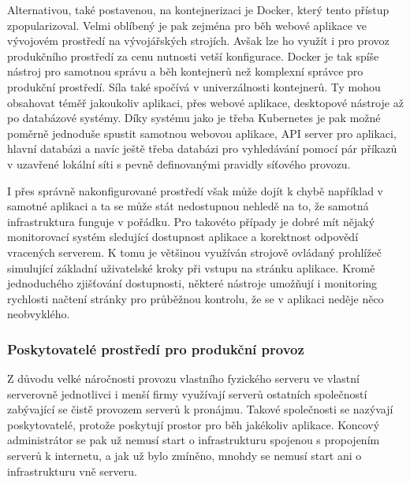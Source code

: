 \begin{itemize}
\begin{itemize}
		Alternativou, také postavenou, na kontejnerizaci je Docker, který tento přístup zpopularizoval.
		Velmi oblíbený je pak zejména pro běh webové aplikace ve vývojovém prostředí na vývojářských strojích.
		Avšak lze ho využít i pro provoz produkčního prostředí za cenu nutnosti vetší konfigurace.
		Docker je tak spíše nástroj pro samotnou správu a běh kontejnerů než komplexní správce pro produkční prostředí.
		Síla také spočívá v univerzálnosti kontejnerů.
		Ty mohou obsahovat téměř jakoukoliv aplikaci, přes webové aplikace, desktopové nástroje až po databázové systémy.
		Díky systému jako je třeba Kubernetes je pak možné poměrně jednoduše spustit samotnou webovou aplikace, API server pro
		aplikaci, hlavní databázi a navíc ještě třeba databázi pro vyhledávání pomocí pár příkazů v uzavřené lokální síti
		s pevně definovanými pravidly síťového provozu.


		I přes správně nakonfigurované prostředí však může dojít k chybě například v samotné aplikaci a ta se může stát nedostupnou
		nehledě na to, že samotná infrastruktura funguje v pořádku.
		Pro takovéto případy je dobré mít nějaký monitorovací systém sledující dostupnost aplikace a korektnost odpovědí
		vracených serverem.
		K tomu je většinou využíván strojově ovládaný prohlížeč simulující základní uživatelské kroky při vstupu na stránku
		aplikace.
		Kromě jednoduchého zjišťování dostupnosti, některé nástroje umožňují i monitoring rychlosti načtení stránky pro
		průběžnou kontrolu, že se v aplikaci neděje něco neobvyklého.

		\subsubsection{Poskytovatelé prostředí pro produkční provoz}

		Z důvodu velké náročnosti provozu vlastního fyzického serveru ve vlastní serverovně jednotlivci i menší firmy
		využívají serverů ostatních společností zabývající se čistě provozem serverů k pronájmu.
		Takové společnosti se nazývají poskytovatelé, protože poskytují prostor pro běh jakékoliv aplikace.
		Koncový administrátor se pak už nemusí start o infrastrukturu spojenou s propojením serverů k internetu, a jak už
		bylo zmíněno, mnohdy se nemusí start ani o infrastrukturu vně serveru.


\end{itemize}
\end{itemize}
